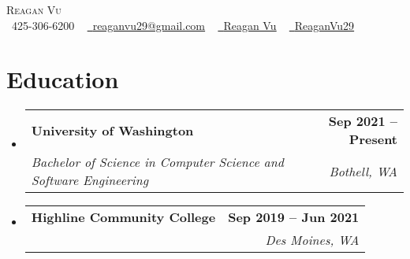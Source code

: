 \documentclass[letterpaper,11pt]{article}
\makeatletter
\newcommand{\resumeSubheading}[4]{
  \vspace{-2pt}\item
    \begin{tabular*}{1.0\textwidth}[t]{l@{\extracolsep{\fill}}r}
      \textbf{#1} & \textbf{\small #2} \\
      \textit{\small#3} & \textit{\small #4} \\
    \end{tabular*}\vspace{-7pt}
}
\newcommand{\resumeSubHeadingListStart}{\begin{itemize}[leftmargin=0.0in, label={}]}
\newcommand{\resumeSubHeadingListEnd}{\end{itemize}}
\makeatother
\begin{document}

\begin{center}
    {\Huge \scshape Reagan Vu} \\ \vspace{1pt}
    \small \raisebox{-0.1\height}\faPhone\ 425-306-6200 ~ \href{mailto:x@gmail.com}{\raisebox{-0.2\height}\faEnvelope\  \underline{reaganvu29@gmail.com}} ~ 
    \href{https://www.linkedin.com/in/reagan-vu-66a922173/}{\raisebox{-0.2\height}\faLinkedin\ \underline{Reagan Vu}}  ~
    \href{https://github.com/ReaganVu29}{\raisebox{-0.2\height}\faGithub\ \underline{ReaganVu29}}
    \vspace{-8pt}
\end{center}


\section{Education}
  \resumeSubHeadingListStart
    \resumeSubheading
      {University of Washington}{Sep 2021 -- Present}
      {Bachelor of Science in Computer Science and Software Engineering}{Bothell, WA}
    \resumeSubheading
      {Highline Community College}{Sep 2019 -- Jun 2021}
      {}{Des Moines, WA}
  \resumeSubHeadingListEnd

\end{document}

